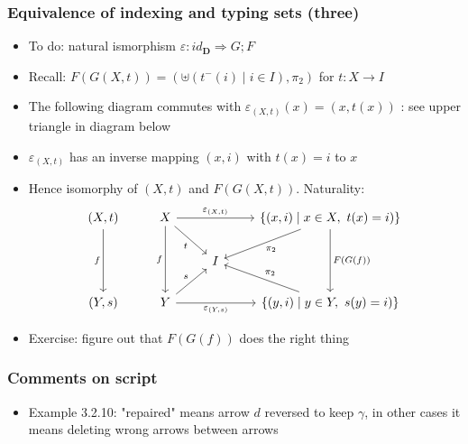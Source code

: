 \documentclass[handout]{beamer}
\newcommand{\To}{\Rightarrow}
\newcommand{\bfsf}[1]{{\boldsymbol{#1}}}
\newcommand{\DD}{\bfsf{D}}
\begin{document}
\frame
  {   
    \frametitle{Equivalence of indexing and typing sets (three)}\label{Ch3:Eq-ind-typ-Set-eps}

 \begin{itemize}[<+->]
\item To do: natural ismorphism $\varepsilon :  id_\DD \To G;F$
\item Recall: $F(G(X,t)) = (\uplus(t^-(i) \mid i\in I),\pi_2)$ for $t:X\to I$
\item The following diagram commutes with $\varepsilon_{(X,t)}(x) = (x,t(x))$ :
see upper triangle in diagram below
\item $\varepsilon_{(X,t)}$ has an inverse mapping $(x,i)$ with $t(x)=i$ to $x$
\item Hence isomorphy of $(X,t)$ and $F(G(X,t))$.  Naturality:
\[
\begin{tikzcd}[ampersand replacement=\&]
(X,t) \arrow[swap]{dd}{f} \& X  \arrow[swap]{dd}{f}\arrow[swap]{dr}{t}\arrow{rr}{\varepsilon_{(X,t)}} 
\&\&\arrow{dd}{F(G(f))}  \set{(x,i)\mid x\in X,\ t(x)=i)}\arrow{dl}{\pi_2} \\
\&\&I\\
(Y,s) \& Y  \arrow[swap]{rr}{\varepsilon_{(Y,s)}}\arrow{ur}{s} 
\&\&  \set{(y,i)\mid y\in Y,\ s(y)=i)} \arrow[swap]{ul}{\pi_2}
\end{tikzcd}
\]
\item Exercise: figure out that $F(G(f))$ does the right thing

 \end{itemize}

 }


\frame
  {   
    \frametitle{Comments on script}\label{Ch3:comments}

 \begin{itemize}[<+->]
\item Example 3.2.10: "repaired"  means arrow $d$ reversed to keep $\gamma$,
in other cases it means deleting wrong arrows between arrows
 \end{itemize}

 }
\end{document}

